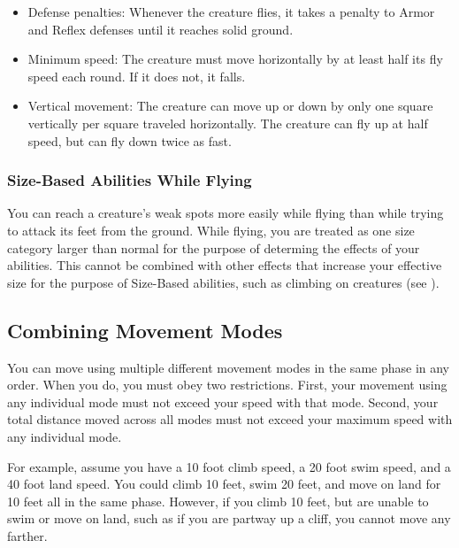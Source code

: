             \begin{itemize}
                \item Defense penalties: Whenever the creature flies, it takes a  penalty to Armor and Reflex defenses until it reaches solid ground.
                \item Minimum speed: The creature must move horizontally by at least half its fly speed each round. If it does not, it falls.
                \item Vertical movement: The creature can move up or down by only one square vertically per square traveled horizontally.
                    The creature can fly up at half speed, but can fly down twice as fast.
            \end{itemize}

        \subsubsection{Size-Based Abilities While Flying}
            You can reach a creature's weak spots more easily while flying than while trying to attack its feet from the ground.
            While flying, you are treated as one size category larger than normal for the purpose of determing the effects of your  abilities.
            This cannot be combined with other effects that increase your effective size for the purpose of Size-Based abilities, such as climbing on creatures (see ).

    \subsection{Combining Movement Modes}
        You can move using multiple different movement modes in the same phase in any order.
        When you do, you must obey two restrictions.
        First, your movement using any individual mode must not exceed your speed with that mode.
        Second, your total distance moved across all modes must not exceed your maximum speed with any individual mode.

        For example, assume you have a 10 foot climb speed, a 20 foot swim speed, and a 40 foot land speed.
        You could climb 10 feet, swim 20 feet, and move on land for 10 feet all in the same phase.
        However, if you climb 10 feet, but are unable to swim or move on land, such as if you are partway up a cliff, you cannot move any farther.

